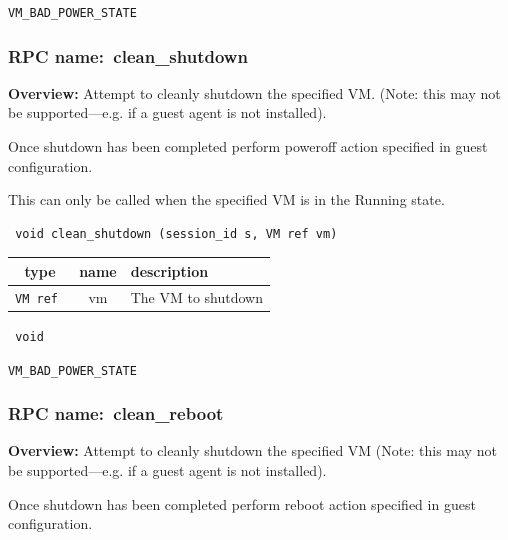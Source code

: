  {\tt VM\_BAD\_POWER\_STATE}

\vspace{0.6cm}
\subsubsection{RPC name:~clean\_shutdown}

{\bf Overview:} 
Attempt to cleanly shutdown the specified VM. (Note: this may not be supported---e.g. if a guest agent is not installed).

Once shutdown has been completed perform poweroff action specified in guest configuration.

This can only be called when the specified VM is in the Running state.

\begin{verbatim} void clean_shutdown (session_id s, VM ref vm)\end{verbatim}



 
\vspace{0.3cm}
\begin{tabular}{|c|c|p{7cm}|}
 \hline
{\bf type} & {\bf name} & {\bf description} \\ \hline
{\tt VM ref } & vm & The VM to shutdown \\ \hline 

\end{tabular}

\vspace{0.3cm}

{\tt 
void
}



\vspace{0.3cm}

 {\tt VM\_BAD\_POWER\_STATE}

\vspace{0.6cm}
\subsubsection{RPC name:~clean\_reboot}

{\bf Overview:} 
Attempt to cleanly shutdown the specified VM (Note: this may not be supported---e.g. if a guest agent is not installed).

Once shutdown has been completed perform reboot action specified in guest configuration.

